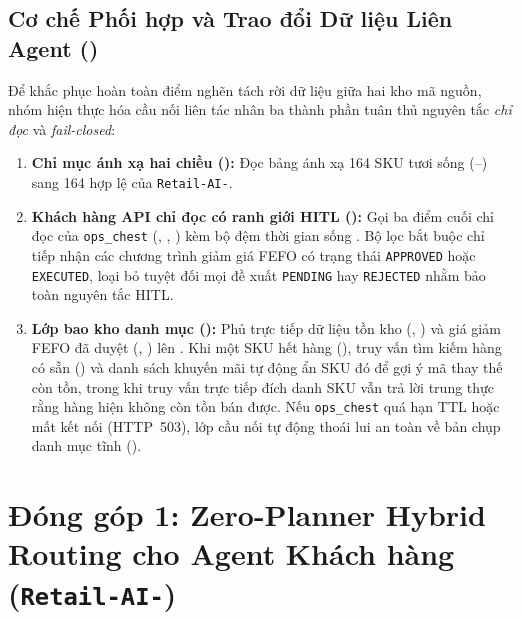 \subsection*{Cơ chế Phối hợp và Trao đổi Dữ liệu Liên Agent ()}
Để khắc phục hoàn toàn điểm nghẽn tách rời dữ liệu giữa hai kho mã nguồn, nhóm hiện thực hóa cầu nối liên tác nhân ba thành phần tuân thủ nguyên tắc \emph{chỉ đọc} và \emph{fail-closed}:
\begin{enumerate}
    \item \textbf{Chỉ mục ánh xạ hai chiều ():} Đọc bảng  ánh xạ 164 SKU tươi sống  (--) sang 164  hợp lệ của \texttt{Retail-AI-}.
    \item \textbf{Khách hàng API chỉ đọc có ranh giới HITL ():} Gọi ba điểm cuối chỉ đọc của \texttt{ops\_chest} (, , ) kèm bộ đệm thời gian sống . Bộ lọc bắt buộc chỉ tiếp nhận các chương trình giảm giá FEFO có trạng thái \texttt{APPROVED} hoặc \texttt{EXECUTED}, loại bỏ tuyệt đối mọi đề xuất \texttt{PENDING} hay \texttt{REJECTED} nhằm bảo toàn nguyên tắc HITL.
    \item \textbf{Lớp bao kho danh mục ():} Phủ trực tiếp dữ liệu tồn kho (, ) và giá giảm FEFO đã duyệt (, ) lên . Khi một SKU hết hàng (), truy vấn tìm kiếm hàng có sẵn () và danh sách khuyến mãi tự động ẩn SKU đó để gợi ý mã thay thế còn tồn, trong khi truy vấn trực tiếp đích danh SKU vẫn trả lời trung thực rằng hàng hiện không còn tồn bán được. Nếu \texttt{ops\_chest} quá hạn TTL hoặc mất kết nối (HTTP~503), lớp cầu nối tự động thoái lui an toàn về bản chụp danh mục tĩnh ().
\end{enumerate}

\section{Đóng góp 1: Zero-Planner Hybrid Routing cho Agent Khách hàng (\texttt{Retail-AI-})}

